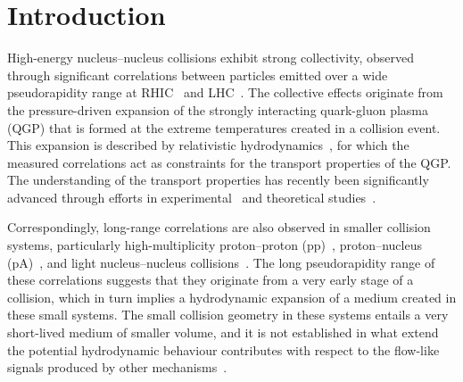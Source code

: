 
\section{Introduction}
\label{sec:intro}

High-energy nucleus--nucleus collisions exhibit strong collectivity, observed through significant correlations between particles emitted over a wide pseudorapidity range at RHIC~\cite{Adams:2005dq,Adcox:2004mh,Arsene:2004fa,Back:2004je} and LHC~\cite{Abelev:2012di, Abelev:2014pua, ATLAS:2011ah}. The collective effects originate from the pressure-driven expansion of the strongly interacting quark-gluon plasma (QGP) that is formed at the extreme temperatures created in a collision event. This expansion is described by relativistic hydrodynamics~\cite{Romatschke:2007mq,Jeon:2015dfa,Romatschke:2017ejr}, for which the measured correlations act as constraints for the transport properties of the QGP. The understanding of the transport properties has recently been significantly advanced through efforts in experimental~\cite{ALICE:2016kpq,Acharya:2017gsw,Acharya:2017zfg,Acharya:2020taj} and theoretical studies~\cite{Niemi:2015qia,Bernhard:2016tnd,Bernhard:2019bmu,Parkkila:2021tqq,Parkkila:2021yha}.

Correspondingly, long-range correlations are also observed in smaller collision systems, particularly high-multiplicity proton--proton (pp)~\cite{Aad:2015gqa,Khachatryan:2015lva,Khachatryan:2016txc,Acharya:2019vdf}, proton--nucleus (pA)~\cite{Abelev:2012ola,Aad:2014lta,Aaboud:2016yar,Khachatryan:2016ibd}, and light nucleus--nucleus collisions~\cite{PHENIX:2018lia,Aidala:2017ajz}. The long pseudorapidity range of these correlations suggests that they originate from a very early stage of a collision, which in turn implies a hydrodynamic expansion of a medium created in these small systems. The small collision geometry in these systems entails a very short-lived medium of smaller volume, and it is not established in what extend the potential hydrodynamic behaviour contributes with respect to the flow-like signals produced by other mechanisms~\cite{Busza:2018rrf,Nagle:2018nvi}.

